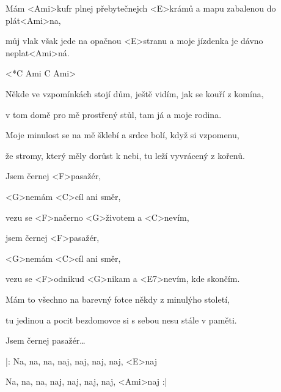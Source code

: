 

\zs
Mám <Ami>kufr plnej přebytečnejch <E>krámů a mapu zabalenou do plát<Ami>na, 

můj vlak však jede na opačnou <E>stranu a moje jízdenka je dávno neplat<Ami>ná. 
\ks

<*C Ami C Ami> 

\zs
Někde ve vzpomínkách stojí dům, ještě vidím, jak se kouří z komína,

v tom domě pro mě prostřený stůl, tam já a moje rodina.

Moje minulost se na mě šklebí a srdce bolí, když si vzpomenu,

že stromy, který měly dorůst k nebi, tu leží vyvrácený z kořenů.
\ks

\zr
Jsem černej <F>pasažér,

<G>nemám <C>cíl ani směr,

vezu se <F>načerno <G>životem a <C>nevím,

jsem černej <F>pasažér,

<G>nemám <C>cíl ani směr,

vezu se <F>odnikud <G>nikam a <E7>nevím, kde skončím.
\kr

\zs
Mám to všechno na barevný fotce někdy z minulýho století,

tu jedinou a pocit bezdomovce si s sebou nesu stále v paměti.
\ks

\zr
Jsem černej pasažér…
\kr

\zs
|: Na, na, na, naj, naj, naj, naj, <E>naj
 
Na, na, na, naj, naj, naj, naj, <Ami>naj :|
\ks

\kp
